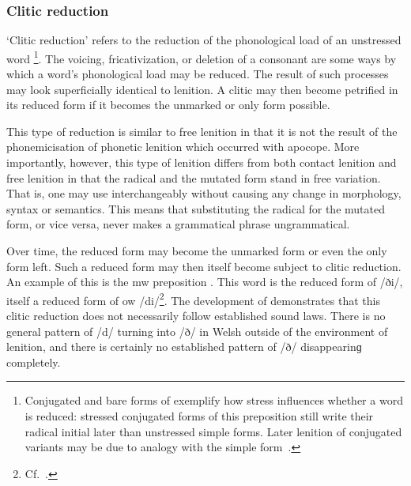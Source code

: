 \subsubsection{Clitic reduction}
`Clitic reduction' refers to the reduction of the phonological load of an unstressed word%
\footnote{Conjugated and bare forms of  exemplify how stress influences whether a word is reduced: stressed conjugated forms of this preposition still write their radical initial later than unstressed simple forms. Later lenition of conjugated variants may be due to analogy with the simple form~\autocite[54]{jongeleen_lenition_2016}.}. 
The voicing, fricativization, or deletion of a consonant are some ways by which a word's phonological load may be reduced.
The result of such processes may look superficially identical to lenition.
A clitic may then become petrified in its reduced form if it becomes the unmarked or only form possible. 

This type of reduction is similar to free lenition in that it is not the result of the phonemicisation of phonetic lenition which occurred with apocope.
More importantly, however, this type of lenition differs from both contact lenition and free lenition in that the radical and the mutated form stand in free variation.
That is, one may use  interchangeably without causing any change in morphology, syntax or semantics. 
This means that substituting the radical for the mutated form, or vice versa, never makes a grammatical phrase ungrammatical. 

Over time, the reduced form may become the unmarked form or even the only form left. 
Such a reduced form may then itself become subject to clitic reduction. 
An example of this is the \gls{mw} preposition . 
This word is the reduced form of  /ði/, itself a reduced form of \gls{ow}  /di/\footnote{Cf.\ .}. 
The development of  demonstrates that this clitic reduction does not necessarily follow established sound laws. 
There is no general pattern of /d/ turning into /ð/ in Welsh outside of the environment of lenition, and there is certainly no established pattern of /ð/ disappearinɡ completely.

